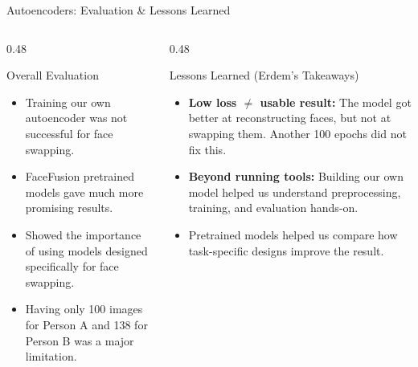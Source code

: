 \begin{frame}{Autoencoders: Evaluation \& Lessons Learned}
    \begin{columns}[T]
        \begin{column}{0.48\textwidth}
            \begin{block}{Overall Evaluation}
                \small
                \begin{itemize}
                    \item Training our own autoencoder was not successful for face swapping.
                    \item FaceFusion pretrained models gave much more promising results.
                    \item Showed the importance of using models designed specifically for face swapping.
                    \item Having only 100 images for Person A and 138 for Person B was a major limitation.
                \end{itemize}
            \end{block}
        \end{column}

        \begin{column}{0.48\textwidth}
            \begin{exampleblock}{Lessons Learned (Erdem's Takeaways)}
                \small
                \begin{itemize}
                    \item \textbf{Low loss $\neq$ usable result:} The model got better at reconstructing faces, but not at swapping them. Another 100 epochs did not fix this.
                    \item \textbf{Beyond running tools:} Building our own model helped us understand preprocessing, training, and evaluation hands-on.
                    \item Pretrained models helped us compare how task-specific designs improve the result.
                \end{itemize}
            \end{exampleblock}
        \end{column}
    \end{columns}
\end{frame}

